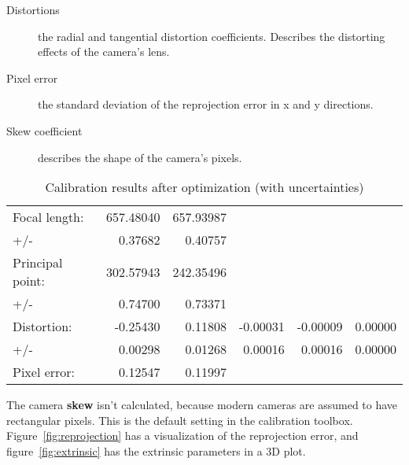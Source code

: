 \begin{description}

  \item[Distortions] the radial and tangential distortion coefficients.
    Describes the distorting effects of the camera's lens.

  \item[Pixel error] the standard deviation of the reprojection error in x and
    y directions.

  \item[Skew coefficient] describes the shape of the camera's pixels.

\end{description}

\begin{table}[h]
  \centering
  \caption{Calibration results after optimization (with uncertainties)}\label{tab:optim_param}
  \begin{tabular}{l N{5}{2} N{5}{2} N{5}{2} N{5}{2} N{5}{2}}
    \toprule

    Focal length:       &   657.48040   &   657.93987   \\
    +/-                 &   0.37682     &   0.40757     \\

    \midrule

    Principal point:    &   302.57943   &   242.35496   \\
    +/-                 &   0.74700     &   0.73371     \\

    \midrule

    Distortion:  &   -0.25430 & 0.11808 & -0.00031 & -0.00009 & 0.00000 \\
    +/-          &   0.00298  & 0.01268 & 0.00016  & 0.00016  & 0.00000 \\

    \midrule

    Pixel error:        &   0.12547     &   0.11997 \\

    \bottomrule
  \end{tabular}
\end{table}

The camera \textbf{skew} isn't calculated, because modern cameras are assumed
to have rectangular pixels. This is the default setting in the calibration
toolbox. Figure~\ref{fig:reprojection} has a visualization of the reprojection
error, and figure~\ref{fig:extrinsic} has the extrinsic parameters in a 3D plot.


